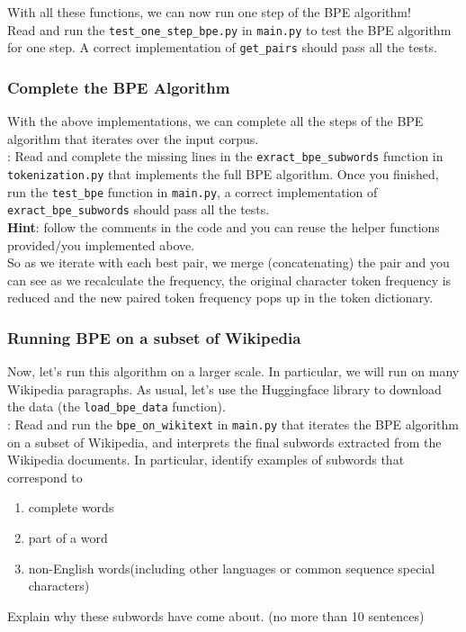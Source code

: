 \noindent With all these functions, we can now run one step of the BPE algorithm! \\

\noindent Read and run the \texttt{test\_one\_step\_bpe.py} in \texttt{main.py} to test the BPE algorithm for one step. A correct implementation of \texttt{get\_pairs} should pass all the tests.

\subsubsection{Complete the BPE Algorithm}
With the above implementations, we can complete all the steps of the BPE algorithm that iterates over the input corpus.\\

\noindent \todo{}: Read and complete the missing lines in the \texttt{exract\_bpe\_subwords} function in \texttt{tokenization.py} that implements the full BPE algorithm. Once you finished, run the \texttt{test\_bpe} function in \texttt{main.py}, a correct implementation of \texttt{exract\_bpe\_subwords} should pass all the tests.\\
\noindent \textbf{Hint}: follow the comments in the code and you can reuse the helper functions provided/you implemented above.\\

So as we iterate with each best pair, we merge (concatenating) the pair and you can see as we recalculate the frequency, the original character token frequency is reduced and the new paired token frequency pops up in the token dictionary.

\subsubsection{Running BPE on a subset of Wikipedia}
Now, let's run this algorithm on a larger scale. In particular, we will run on many Wikipedia paragraphs. As usual, let's use the Huggingface library to download the data (the \texttt{load\_bpe\_data} function).\\

\noindent \todo{}: Read and run the \texttt{bpe\_on\_wikitext} in \texttt{main.py} that iterates the BPE algorithm on a subset of Wikipedia, and interprets the final subwords extracted from the Wikipedia documents. In particular, identify examples of subwords that correspond to
\begin{enumerate}
    \item complete words
    \item part of a word
    \item non-English words(including other languages or common sequence special characters)
\end{enumerate}
Explain why these subwords have come about. (no more than 10 sentences)

